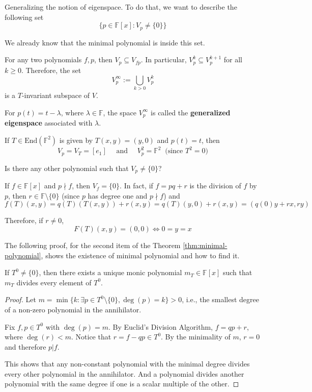 Generalizing the notion of eigenspace. To do that, we want to describe the following set
\begin{equation}\label{eq:set-goal-describe}
	\{ p \in \mathbb{F}[x] : V_p \neq \{ 0 \} \}
\end{equation}

We already know that the minimal polynomial is inside this set.

For any two polynomials $f, p$, then $V_p \subseteq V_{fp}$. In particular, $V_p^k \subseteq V_p^{k+1}$ for all $k \geq 0$. Therefore, the set
\[
	V_p^\infty := \bigcup_{k > 0} V_p^k
\]
is a $T$-invariant subspace of $V$.

\begin{definition}
	For $p(t) = t - \lambda$, where $\lambda \in \mathbb{F}$, the space $V_p^\infty$ is called the \textbf{generalized eigenspace} associated with $\lambda$.
\end{definition}

\begin{example}
	If $T \in \text{End}(\mathbb{F}^2)$ is given by $T(x,y) = (y,0)$ and $p(t) = t$, then
	\[
		V_p = V_T = [e_1] \quad \text{ and } \quad V_p^2 = \mathbb{F}^2 ~\text{ (since $T^2 = 0$)}
	\]
	
	Is there any other polynomial such that $V_p \neq \{ 0 \}$?
	
	If $f \in \mathbb{F}[x]$ and $p \nmid f$, then $V_f = \{ 0 \}$. In fact, if $f = pq+r$ is the division of $f$ by $p$, then $r \in \mathbb{F} \setminus \{ 0 \}$ (since $p$ has degree one and $p \nmid f$) and
	\[
		f(T)(x,y) = q(T)(T(x,y)) + r(x,y) = q(T)(y,0) + r(x,y) = (q(0)y + rx, ry)
	\]
	
	Therefore, if $r \neq 0$, 
	\[
		F(T)(x,y) = (0, 0) \iff 0 = y = x
	\]
\end{example}

The following proof, for the second item of the Theorem \ref{thm:minimal-polynomial}, shows the existence of minimal polynomial and how to find it.

\begin{theorem}
	If $T^0 \neq \{ 0 \}$, then there exists a unique monic polynomial $m_T \in \mathbb{F}[x]$ such that $m_T$ divides every element of $T^0$.
\end{theorem}

\begin{proof}
	Let $m = \min \{ k : \exists p \in T^0 \setminus \{ 0 \}, \deg(p) = k \} > 0$, i.e., the smallest degree of a non-zero polynomial in the annihilator.
	
	Fix $f, p \in T^0$ with $\deg(p) = m$. By Euclid's Division Algorithm, $f = qp + r$, where $\deg(r) < m$. Notice that $r = f - qp \in T^0$. By the minimality of $m$, $r = 0$ and therefore $p | f$.
	
	This shows that any non-constant polynomial with the minimal degree divides every other polynomial in the annihilator. And a polynomial divides another polynomial with the same degree if one is a scalar multiple of the other.
\end{proof} 

